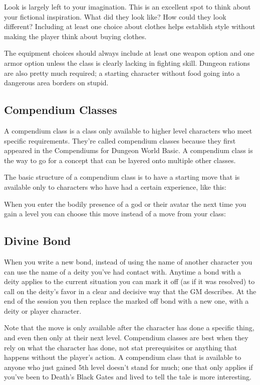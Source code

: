  Look is largely left to your imagination. This is an excellent spot to think about your fictional inspiration. What did they look like? How could they look different? Including at least one choice about clothes helps establish style without making the player think about buying clothes.


 The equipment choices should always include at least one weapon option and one armor option unless the class is clearly lacking in fighting skill. Dungeon rations are also pretty much required; a starting character without food going into a dangerous area borders on stupid.
\subsection{Compendium Classes}


 A compendium class is a class only available to higher level characters who meet specific requirements. They're called compendium classes because they first appeared in the Compendiums for Dungeon World Basic. A compendium class is the way to go for a concept that can be layered onto multiple other classes.


 The basic structure of a compendium class is to have a starting move that is available only to characters who have had a certain experience, like this:


 When you enter the bodily presence of a god or their avatar the next time you gain a level you can choose this move instead of a move from your class:
\subsection{Divine Bond}


 When you write a new bond, instead of using the name of another character you can use the name of a deity you've had contact with. Anytime a bond with a deity applies to the current situation you can mark it off (as if it was resolved) to call on the deity's favor in a clear and decisive way that the GM describes. At the end of the session you then replace the marked off bond with a new one, with a deity or player character.


 Note that the move is only available after the character has done a specific thing, and even then only at their next level. Compendium classes are best when they rely on what the character has done, not stat prerequisites or anything that happens without the player's action. A compendium class that is available to anyone who just gained 5th level doesn't stand for much; one that only applies if you've been to Death's Black Gates and lived to tell the tale is more interesting.


